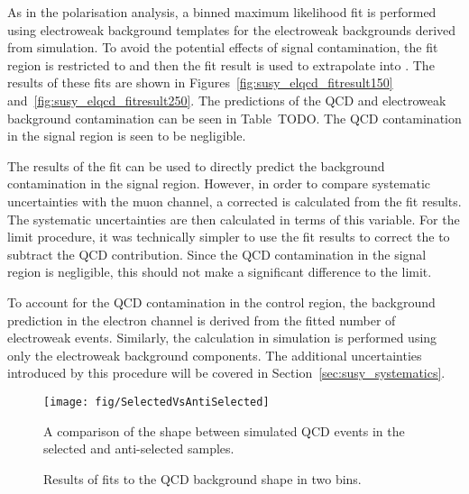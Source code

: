 As in the \PW polarisation analysis, a binned maximum likelihood fit is
performed using electroweak background templates for the electroweak backgrounds
derived from simulation. To avoid the potential effects of signal contamination,
the fit region is restricted to \LPcontrol and then the fit result is used to
extrapolate into \LPsignal. The results of these fits are shown in
Figures~\ref{fig:susy_elqcd_fitresult150}
and~\ref{fig:susy_elqcd_fitresult250}. The predictions of the \ac{QCD} and
electroweak background contamination can be seen in Table~TODO. The \ac{QCD}
contamination in the signal region is seen to be negligible.

The results of the fit can be used to directly predict the background
contamination in the signal region. However, in order to compare systematic
uncertainties with the muon channel, a corrected \RCS is calculated from the fit
results. The systematic uncertainties are then calculated in terms of this
variable. For the limit procedure, it was technically simpler to use the fit
results to correct the \NControl to subtract the \ac{QCD} contribution. Since
the \ac{QCD} contamination in the signal region is negligible, this should not
make a significant difference to the limit.

To account for the \ac{QCD} contamination in the control
region, the background prediction in the electron channel is derived from the
fitted number of electroweak events. Similarly, the \RCS calculation in
simulation is performed using only the electroweak background components. The
additional uncertainties introduced by this procedure will be covered in
Section~\ref{sec:susy_systematics}.


\begin{figure}
\centering
\texttt{[image: fig/SelectedVsAntiSelected]}
\caption{A comparison of the \LP shape between simulated \ac{QCD} events in the
  selected and anti-selected samples.}
\label{fig:susy_elqcd_selasel}
\end{figure}


\begin{figure}
\centering
{}\quad
{}
\caption{Results of fits to the \ac{QCD} background shape in two \STlep bins.}
\label{fig:susy_elqcd}
\end{figure}

